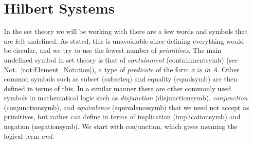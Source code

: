 \section{Hilbert Systems}
    In the set theory we will be working with there are a few words and symbols
    that are left undefined. As stated, this is unavoidable since defining
    everything would be circular, and we try to use the fewest number of
    \textit{primitives}. The main undefined symbol in set theory is that of
    \textit{containment} (\gls{containmentsymb})
    (see Not.~\ref{not:Element_Notation}), a type of
    \textit{\gls{predicate}} of the form \textit{x is in A}.
    Other common symbols such as subset (\gls{subseteq}) and equality
    (\gls{equalsymb}) are then defined in terms of this. In a similar manner
    there are other commonly used symbols in mathematical logic such as
    \textit{disjunction} (\gls{disjunctionsymb}), \textit{conjunction}
    (\gls{conjunctionsymb}), and \textit{equivalence} (\gls{equivalencesymb})
    that we need not accept as primitives, but rather can define in terms of
    implication (\gls{implicationsymb}) and negation (\gls{negationsymb}). We
    start with conjunction, which gives meaning the logical term \textit{and}.
